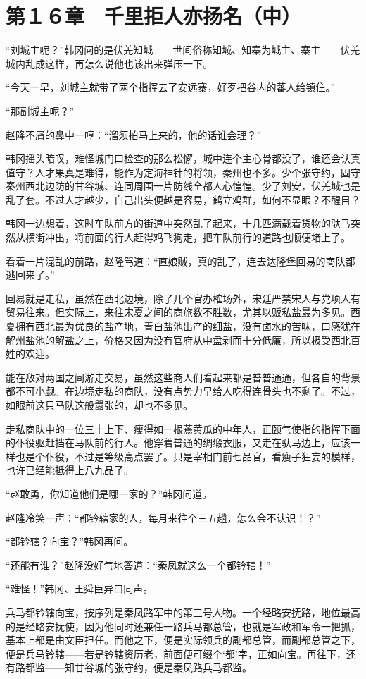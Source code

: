 \section{第１６章　千里拒人亦扬名（中）}

“刘城主呢？”韩冈问的是伏羌知城——世间俗称知城、知寨为城主、寨主——伏羌城内乱成这样，再怎么说他也该出来弹压一下。

“今天一早，刘城主就带了两个指挥去了安远寨，好歹把谷内的蕃人给镇住。”

“那副城主呢？”

赵隆不屑的鼻中一哼：“溜须拍马上来的，他的话谁会理？”

韩冈摇头暗叹，难怪城门口检查的那么松懈，城中连个主心骨都没了，谁还会认真值守？人才果真是难得，能作为定海神针的将领，秦州也不多。少个张守约，固守秦州西北边防的甘谷城、连同周围一片防线全都人心惶惶。少了刘安，伏羌城也是乱了套。不过人才越少，自己出头便越是容易，鹤立鸡群，如何不显眼？不醒目？

韩冈一边想着，这时车队前方的街道中突然乱了起来，十几匹满载着货物的驮马突然从横街冲出，将前面的行人赶得鸡飞狗走，把车队前行的道路也顺便堵上了。

看着一片混乱的前路，赵隆骂道：“直娘贼，真的乱了，连去达隆堡回易的商队都逃回来了。”

回易就是走私，虽然在西北边境，除了几个官办榷场外，宋廷严禁宋人与党项人有贸易往来。但实际上，来往宋夏之间的商旅数不胜数，尤其以贩私盐最为多见。西夏拥有西北最为优良的盐产地，青白盐池出产的细盐，没有卤水的苦味，口感犹在解州盐池的解盐之上，价格又因为没有官府从中盘剥而十分低廉，所以极受西北百姓的欢迎。

能在敌对两国之间游走交易，虽然这些商人们看起来都是普普通通，但各自的背景都不可小觑。在边境走私的商队，没有点势力早给人吃得连骨头也不剩了。不过，如眼前这只马队这般嚣张的，却也不多见。

走私商队中的一位三十上下、瘦得如一根蔫黄瓜的中年人，正颐气使指的指挥下面的仆役驱赶挡在马队前的行人。他穿着普通的绸缎衣服，又走在驮马边上，应该一样也是个仆役，不过是等级高点罢了。只是宰相门前七品官，看瘦子狂妄的模样，也许已经能抵得上八九品了。

“赵敢勇，你知道他们是哪一家的？”韩冈问道。

赵隆冷笑一声：“都钤辖家的人，每月来往个三五趟，怎么会不认识！？”

“都钤辖？向宝？”韩冈再问。

“还能有谁？”赵隆没好气地答道：“秦凤就这么一个都钤辖！”

“难怪！”韩冈、王舜臣异口同声。

兵马都钤辖向宝，按序列是秦凤路军中的第三号人物。一个经略安抚路，地位最高的是经略安抚使，因为他同时还兼任一路兵马都总管，也就是军政和军令一把抓，基本上都是由文臣担任。而他之下，便是实际领兵的副都总管，而副都总管之下，便是兵马钤辖——若是钤辖资历老，前面便可缀个‘都’字，正如向宝。再往下，还有路都监——知甘谷城的张守约，便是秦凤路兵马都监。

